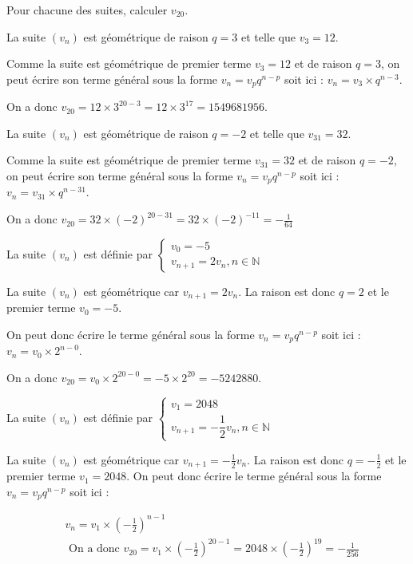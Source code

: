 \documentclass[11pt,a4paper]{article}  %
\begin{document}
Pour chacune des suites, calculer $v_{20}$.
\begin{enumMet}
	\item La suite $\left(v_n\right)$ est géométrique de raison $q=3$ et telle que $v_3=12$.
	\begin{corrBox}
		Comme la suite est géométrique de premier terme $v_3=12$ et de raison $q=3$, on peut écrire son terme général sous la forme $v_n=v_p q^{n-p}$ soit ici : $v_n=v_3 \times q^{n-3}$.
		
		On a donc $v_{20}=12 \times 3^{20-3}=12 \times 3^{17}=1549681956$.	
	\end{corrBox}
	\item La suite $\left(v_n\right)$ est géométrique de raison $q=-2$ et telle que $v_{31}=32$.
	\begin{corrBox}
		Comme la suite est géométrique de premier terme $v_{31}=32$ et de raison $q=-2$, on peut écrire son terme général sous la forme $v_n=v_p q^{n-p}$ soit ici : $v_n=v_{31} \times q^{n-31}$.
		
		On a donc $v_{20}=32 \times(-2)^{20-31}=32 \times(-2)^{-11}=-\frac{1}{64}$		
	\end{corrBox}
	\item La suite $\left(v_n\right)$ est définie par $\left\{\begin{array}{l}v_0=-5 \\ v_{n+1}=2 v_n, n \in \mathbb{N}\end{array}\right.$
	\begin{corrBox}
		La suite $\left(v_n\right)$ est géométrique car $v_{n+1}=2 v_n$. La raison est donc $q=2$ et le premier terme $v_0=-5$.
		
		On peut donc écrire le terme général sous la forme $v_n=v_p q^{n-p}$ soit ici : $v_n=v_0 \times 2^{n-0}$. 
		
		On a donc $v_{20}=v_0 \times 2^{20-0}=-5 \times 2^{20}=-5242880$.
			
	\end{corrBox}
	\item La suite $\left(v_n\right)$ est définie par $\left\{\begin{array}{l}v_1=2048 \\ v_{n+1}=-\dfrac{1}{2} v_n, n \in \mathbb{N}\end{array}\right.$
	\begin{corrBox}
		La suite $\left(v_n\right)$ est géométrique car $v_{n+1}=-\frac{1}{2} v_n$. La raison est donc $q=-\frac{1}{2}$ et le premier terme $v_1=2048$.
		On peut donc écrire le terme général sous la forme $v_n=v_p q^{n-p}$ soit ici :
		
		$$
		\begin{aligned}
			& v_n=v_1 \times\left(-\frac{1}{2}\right)^{n-1} \\
			& \text { On a donc } v_{20}=v_1 \times\left(-\frac{1}{2}\right)^{20-1}=2048 \times\left(-\frac{1}{2}\right)^{19}=-\frac{1}{256}
		\end{aligned}
		$$
						
	\end{corrBox}
\end{enumMet}
\end{document}
